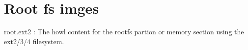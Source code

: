 \section{Root fs imges}%
\label{sec:Root fs imges}

\begin{itemize}
    \tem root.ext2 : The howl content for the rootfs partion or memory section
    using the ext2/3/4 filesystem.
\end{itemize}
